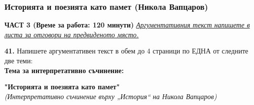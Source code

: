 \documentclass[12pt,a4paper]{article}
\begin{document}
\subsubsection{Историята и поезията като памет (Никола Вапцаров)}
\vspace{0.5cm}
\begin{center}
\textbf{ЧАСТ 3 (Време за работа: 120 минути)}
\vspace{0.2cm}
{\textit{\underline{Аргументативния текст напишете в листа за отговори на предвиденото място.}}}
\vspace{0.1cm}
\end{center}
\textbf{41.} Напишете аргументативен текст в обем до 4 страници по ЕДНА от следните две теми:
\\
\vspace{0.2cm}
\textbf{Тема за интерпретативно съчинение:}
\vspace{0.1cm}
\begin{center}
\textbf{"Историята и поезията като памет"}
\\
\textit{(Интерпретативно съчинение върху „История“ на Никола Вапцаров)}
\end{center}
\end{document}
